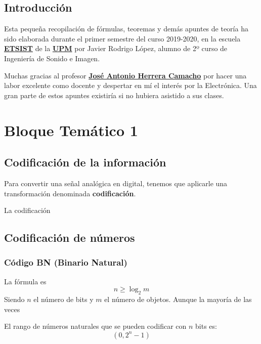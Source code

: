 \documentclass[a4paper]{book}
\begin{document}
\newpage

\setlength{\parskip}{0.5em}

\section*{Introducción}
Esta pequeña recopilación de fórmulas, teoremas y demás apuntes de teoría ha sido elaborada durante el primer semestre del curso 2019-2020, en la escuela \href{https://www.etsist.upm.es/}{\textbf{ETSIST}} de la \href{http://www.upm.es/}{\textbf{UPM}} por Javier Rodrigo López, alumno de 2º curso de Ingeniería de Sonido e Imagen.

Muchas gracias al profesor \href{https://www.euitt.upm.es/escuela/directorio?departamento=DTE&idTrabajador=c0874849914b0380a54a53f80d4d60f1}{\textbf{José Antonio Herrera Camacho}} por hacer una labor excelente como docente y despertar en mí el interés por la Electrónica. Una gran parte de estos apuntes existiría si no hubiera asistido a sus clases.
\newpage

\setlength{\parskip}{0em}
\tableofcontents 
\setlength{\parskip}{0.5em}


\chapter{Bloque Temático 1}

\section{Codificación de la información}

Para convertir una señal analógica en digital, tenemos que aplicarle una transformación denominada \textbf{codificación}. 

La codificación 
\section{Codificación de números}
\subsection{Código BN (Binario Natural)}

La fórmula es \[n\geq \log_2{m}\]
Siendo $n$ el número de bits y $m$ el número de objetos. Aunque la mayoría de las veces

El rango de números naturales que se pueden codificar con $n$ bits es:
\[\left( 0, 2^{n}-1 \right)\]
\end{document}
